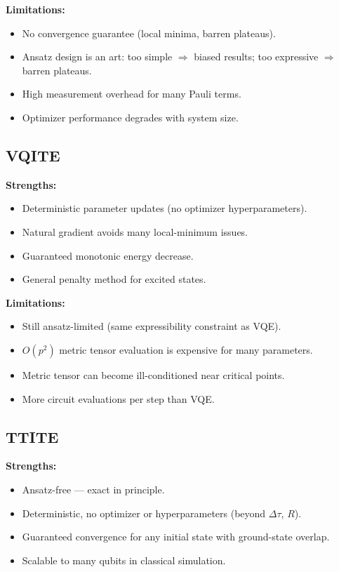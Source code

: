 \documentclass[11pt,a4paper]{article}
\begin{document}
\textbf{Limitations:}
\begin{itemize}[nosep]
  \item No convergence guarantee (local minima, barren plateaus).
  \item Ansatz design is an art: too simple $\Rightarrow$ biased results;
    too expressive $\Rightarrow$ barren plateaus.
  \item High measurement overhead for many Pauli terms.
  \item Optimizer performance degrades with system size.
\end{itemize}

\subsection{VQITE}

\textbf{Strengths:}
\begin{itemize}[nosep]
  \item Deterministic parameter updates (no optimizer hyperparameters).
  \item Natural gradient avoids many local-minimum issues.
  \item Guaranteed monotonic energy decrease.
  \item General penalty method for excited states.
\end{itemize}

\textbf{Limitations:}
\begin{itemize}[nosep]
  \item Still ansatz-limited (same expressibility constraint as VQE).
  \item $O(p^2)$ metric tensor evaluation is expensive for many parameters.
  \item Metric tensor can become ill-conditioned near critical points.
  \item More circuit evaluations per step than VQE.
\end{itemize}

\subsection{TTITE}

\textbf{Strengths:}
\begin{itemize}[nosep]
  \item Ansatz-free --- exact in principle.
  \item Deterministic, no optimizer or hyperparameters (beyond $\Delta\tau$, $R$).
  \item Guaranteed convergence for any initial state with ground-state overlap.
  \item Scalable to many qubits in classical simulation.
\end{itemize}
\end{document}
